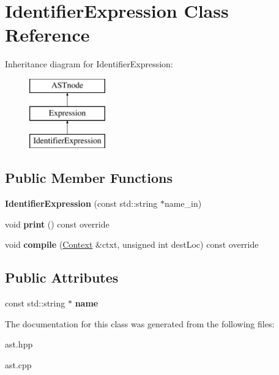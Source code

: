 \hypertarget{class_identifier_expression}{}\section{Identifier\+Expression Class Reference}
\label{class_identifier_expression}
Inheritance diagram for Identifier\+Expression\+:\begin{figure}[H]
\begin{center}
\leavevmode
\includegraphics[height=3.000000cm]{class_identifier_expression}
\end{center}
\end{figure}
\subsection*{Public Member Functions}
\begin{DoxyCompactItemize}
\item 
\mbox{\label{class_identifier_expression_a471958b271d841936ea341349af2c921}} 
{\bfseries Identifier\+Expression} (const std\+::string $\ast$name\+\_\+in)
\item 
\mbox{\label{class_identifier_expression_a832327eff23e31cf8378c71c46d4d894}} 
void {\bfseries print} () const override
\item 
\mbox{\label{class_identifier_expression_aeb7d933cae1a1e81affc9ac6c887cf10}} 
void {\bfseries compile} (\hyperlink{class_context}{Context} \&ctxt, unsigned int dest\+Loc) const override
\end{DoxyCompactItemize}
\subsection*{Public Attributes}
\begin{DoxyCompactItemize}
\item 
\mbox{\label{class_identifier_expression_a0420bfd651f78cd02094288b72878821}} 
const std\+::string $\ast$ {\bfseries name}
\end{DoxyCompactItemize}


The documentation for this class was generated from the following files\+:\begin{DoxyCompactItemize}
\item 
ast.\+hpp\item 
ast.\+cpp\end{DoxyCompactItemize}
